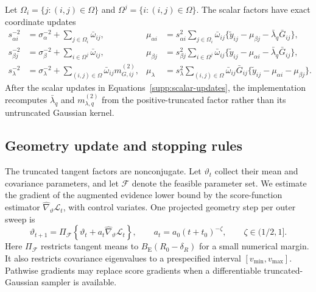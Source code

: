 \documentclass[
  12pt]{article}
\theoremstyle{definition}
\theoremstyle{plain}
\begin{document}
Let $\Omega_i=\{j:(i,j)\in\Omega\}$ and $\Omega^j=\{i:(i,j)\in\Omega\}$. The scalar factors have exact coordinate updates
\begin{subequations}\label{supp:scalar-updates}
	\begin{align}
		s_{\alpha i}^{-2}
		&=\sigma_\alpha^{-2}+\sum_{j\in\Omega_i}\bar\omega_{ij},
		&
		\mu_{\alpha i}
		&=s_{\alpha i}^2\sum_{j\in\Omega_i}\bar\omega_{ij}
		\{\widetilde y_{ij}-\mu_{\beta j}-\bar\lambda_q\bar G_{ij}\},\\
		s_{\beta j}^{-2}
		&=\sigma_\beta^{-2}+\sum_{i\in\Omega^j}\bar\omega_{ij},
		&
		\mu_{\beta j}
		&=s_{\beta j}^2\sum_{i\in\Omega^j}\bar\omega_{ij}
		\{\widetilde y_{ij}-\mu_{\alpha i}-\bar\lambda_q\bar G_{ij}\},\\
		s_\lambda^{-2}
		&=\sigma_\lambda^{-2}+\sum_{(i,j)\in\Omega}\bar\omega_{ij}m_{G,ij}^{(2)},
		&
		\mu_\lambda
		&=s_\lambda^2\sum_{(i,j)\in\Omega}\bar\omega_{ij}\bar G_{ij}
		\{\widetilde y_{ij}-\mu_{\alpha i}-\mu_{\beta j}\}.
	\end{align}
\end{subequations}
After the scalar updates in Equations~\eqref{supp:scalar-updates}, the implementation recomputes $\bar\lambda_q$ and $m_{\lambda,q}^{(2)}$ from the positive-truncated factor rather than its untruncated Gaussian kernel.

\subsection{Geometry update and stopping rules}

The truncated tangent factors are nonconjugate. Let $\vartheta_t$ collect their mean and covariance parameters, and let $\mathcal F$ denote the feasible parameter set. We estimate the gradient of the augmented evidence lower bound by the score-function estimator $\widehat\nabla_\vartheta\mathcal L_t$, with control variates. One projected geometry step per outer sweep is
\begin{equation}\label{supp:tangent-update}
	\vartheta_{t+1}
	=\Pi_{\mathcal F}\!\left\{\vartheta_t+a_t
	\widehat\nabla_\vartheta\mathcal L_t\right\},
	\qquad
	a_t=a_0(t+t_0)^{-\zeta},
	\qquad \zeta\in(1/2,1].
\end{equation}
Here $\Pi_{\mathcal F}$ restricts tangent means to $B_{\mathrm E}(R_0-\delta_R)$ for a small numerical margin. It also restricts covariance eigenvalues to a prespecified interval $[v_{\min},v_{\max}]$. Pathwise gradients may replace score gradients when a differentiable truncated-Gaussian sampler is available.
\end{document}
